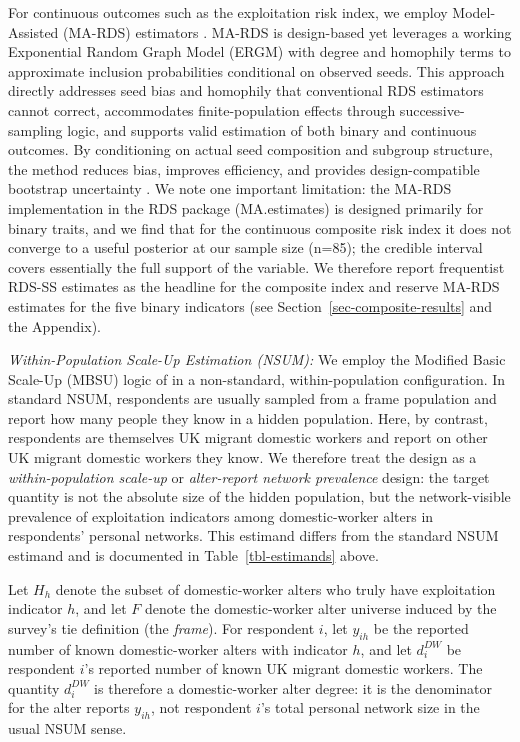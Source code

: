 \documentclass[
  12pt,
  letterpaper,
  DIV=11,
  numbers=noendperiod]{scrartcl}
\begin{document}
For continuous outcomes such as the exploitation risk index, we employ
Model-Assisted (MA-RDS) estimators \autocite{gile15-network}. MA-RDS is
design-based yet leverages a working Exponential Random Graph Model
(ERGM) with degree and homophily terms to approximate inclusion
probabilities conditional on observed seeds. This approach directly
addresses seed bias and homophily that conventional RDS estimators
cannot correct, accommodates finite-population effects through
successive-sampling logic, and supports valid estimation of both binary
and continuous outcomes. By conditioning on actual seed composition and
subgroup structure, the method reduces bias, improves efficiency, and
provides design-compatible bootstrap uncertainty
\autocite{gile11-improved}. We note one important limitation: the MA-RDS
implementation in the RDS package (MA.estimates) is designed primarily
for binary traits, and we find that for the continuous composite risk
index it does not converge to a useful posterior at our sample size
(n=85); the credible interval covers essentially the full support of the
variable. We therefore report frequentist RDS-SS estimates as the
headline for the composite index and reserve MA-RDS estimates for the
five binary indicators (see Section~\ref{sec-composite-results} and the
Appendix).

\emph{Within-Population Scale-Up Estimation (NSUM):} We employ the
Modified Basic Scale-Up (MBSU) logic of \textcite{feeh16-generalizing}
in a non-standard, within-population configuration. In standard NSUM,
respondents are usually sampled from a frame population and report how
many people they know in a hidden population. Here, by contrast,
respondents are themselves UK migrant domestic workers and report on
other UK migrant domestic workers they know. We therefore treat the
design as a \emph{within-population scale-up} or \emph{alter-report
network prevalence} design: the target quantity is not the absolute size
of the hidden population, but the network-visible prevalence of
exploitation indicators among domestic-worker alters in respondents'
personal networks. This estimand differs from the standard NSUM estimand
and is documented in Table~\ref{tbl-estimands} above.

Let \(H_h\) denote the subset of domestic-worker alters who truly have
exploitation indicator \(h\), and let \(F\) denote the domestic-worker
alter universe induced by the survey's tie definition (the
\emph{frame}). For respondent \(i\), let \(y_{ih}\) be the reported
number of known domestic-worker alters with indicator \(h\), and let
\(d_i^{DW}\) be respondent \(i\)'s reported number of known UK migrant
domestic workers. The quantity \(d_i^{DW}\) is therefore a
domestic-worker alter degree: it is the denominator for the alter
reports \(y_{ih}\), not respondent \(i\)'s total personal network size
in the usual NSUM sense.
\end{document}
